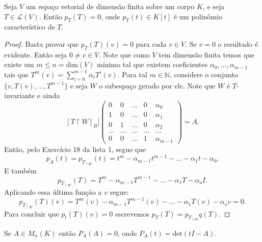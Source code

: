 \documentclass[11pt,twoside,a4paper]{book}
\begin{document}
  \begin{teorema}
   Seja \(V\) um espaço vetorial de dimensão finita sobre um corpo \(K\), e seja \(T\in\mathcal{L}(V)\). Então \(p_T(T)=0\), onde \(p_T(t)\in K[t]\) é um polinômio característico de \(T\). 
  \end{teorema}
   \begin{proof}
     Basta provar que \(p_T(T)(v)=0\) para cada \(v\in V\). Se \(v=0\) o resultado é evidente.
     Então seja \(0\not=v\in V\).
     Note que como \(V\) tem dimensão finita temos que existe um \(m \leq n = \text{dim}(V)\) mínimo tal que existem coeficientes \(\alpha_0,\ldots,\alpha_{m-1}\) tais que \(T^m(v)=\sum_{i=0}^{m-1}\alpha_iT^i(v)\). Para tal \(m\in\mathbb{N}\), considere o conjunto
     \(\{v,T(v),\ldots, T^{m-1}\}\) e seja \(W\) o subespaço gerado por ele. Note que \(W\) é \(T\)-invariante e ainda
     \[[T\upharpoonright W]_B]\begin{pmatrix}
         0 & 0 & \ldots& 0 &\alpha_0
         \\ 1 & 0 & \ldots & 0 & \alpha_1
         \\ 0 & 1 & \ldots & 0 & \alpha_2
         \\ \ldots & \ldots  & \ldots  & \ldots  & \ldots \
         \\ 0 & 0 & \ldots & 1 & \alpha_{m-1} 
       \end{pmatrix}=A.\]
     Então, pelo Exercício 18 da lista 1, segue que
     \[p_A(t)=
       p_{T_{\upharpoonright W}}(t)=
       t^m -\alpha_{m-1}t^{m-1}- \ldots -\alpha_1t-\alpha_0.\]
     E também
     \[p_{T_{\upharpoonright W}}(T)=
       T^m-\alpha_{m-1}T^{m-1}-\ldots-\alpha_1 T-\alpha_o I.\]
     Aplicando essa última função a \(v\) segue:
     \[p_{T_{\upharpoonright W}}(T)(v)=
       T^m(v)-\alpha_{m-1}T^{m-1}(v)-\ldots-\alpha_1 T(v)-\alpha_o v=0.\]
     Para concluir que \(p_t(T)(v)=0\)
     escrevemos \(p_T(T)=p_{T_{\upharpoonright W}}q(T).\)
     \end{proof}
     \begin{corolario}
       Se \(A\in M_n(K)\) então \(P_A(A)=0\),
       onde \(P_A(t)=\text{det}(tI -A)\). \end{corolario}
\end{document}
